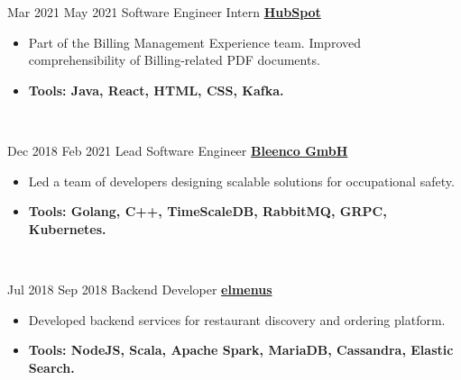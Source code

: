 \begin{twenty}
    \twentyitem
        {Mar 2021}
        {May 2021}
        {Software Engineer Intern}
        {\large\textbf{\href{https://www.hubspot.com/}{HubSpot}}}
        {
            \begin{itemize}
                \item Part of the Billing Management Experience team. Improved comprehensibility of Billing-related PDF documents. 
                \item \textbf{Tools: Java, React, HTML, CSS, Kafka.}
            \end{itemize}
        }
        {\\}

    \twentyitem
        {Dec 2018}
        {Feb 2021}
        {Lead Software Engineer}
        {\large\textbf{\href{https://bleenco.com/}{Bleenco GmbH}}}
        {
            \begin{itemize}
                \item Led a team of developers designing scalable solutions for occupational safety.
                \item \textbf{Tools: Golang, C++, TimeScaleDB, RabbitMQ, GRPC, Kubernetes.}
            \end{itemize}
        }
        {\\}

    \twentyitem
        {Jul 2018}
        {Sep 2018}
        {Backend Developer}
        {\large\textbf{\href{https://elmenus.com/}{elmenus}}}
        {
            \begin{itemize}
                \item Developed backend services for restaurant discovery and ordering platform.
                \item \textbf{Tools: NodeJS, Scala, Apache Spark, MariaDB, Cassandra, Elastic Search.}
            \end{itemize}
        }
        {\\}


\end{twenty}
